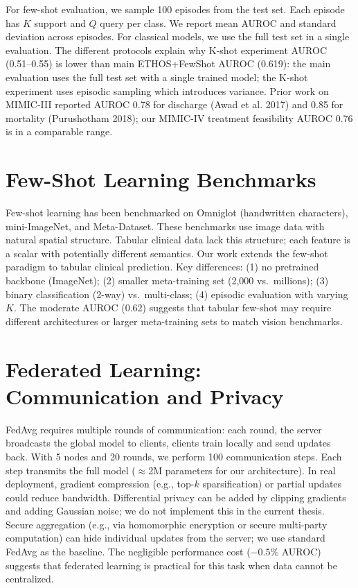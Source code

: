 For few-shot evaluation, we sample 100 episodes from the test set. Each episode has $K$ support and $Q$ query per class. We report mean AUROC and standard deviation across episodes. For classical models, we use the full test set in a single evaluation. The different protocols explain why K-shot experiment AUROC (0.51--0.55) is lower than main ETHOS+FewShot AUROC (0.619): the main evaluation uses the full test set with a single trained model; the K-shot experiment uses episodic sampling which introduces variance. Prior work on MIMIC-III reported AUROC 0.78 for discharge (Awad et al. 2017) and 0.85 for mortality (Purushotham 2018); our MIMIC-IV treatment feasibility AUROC 0.76 is in a comparable range.

\section{Few-Shot Learning Benchmarks}

Few-shot learning has been benchmarked on Omniglot (handwritten characters), mini-ImageNet, and Meta-Dataset. These benchmarks use image data with natural spatial structure. Tabular clinical data lack this structure; each feature is a scalar with potentially different semantics. Our work extends the few-shot paradigm to tabular clinical prediction. Key differences: (1) no pretrained backbone (ImageNet); (2) smaller meta-training set (2,000 vs.\ millions); (3) binary classification (2-way) vs.\ multi-class; (4) episodic evaluation with varying $K$. The moderate AUROC (0.62) suggests that tabular few-shot may require different architectures or larger meta-training sets to match vision benchmarks.

\section{Federated Learning: Communication and Privacy}

FedAvg requires multiple rounds of communication: each round, the server broadcasts the global model to clients, clients train locally and send updates back. With 5 nodes and 20 rounds, we perform 100 communication steps. Each step transmits the full model ($\approx$2M parameters for our architecture). In real deployment, gradient compression (e.g., top-$k$ sparsification) or partial updates could reduce bandwidth. Differential privacy can be added by clipping gradients and adding Gaussian noise; we do not implement this in the current thesis. Secure aggregation (e.g., via homomorphic encryption or secure multi-party computation) can hide individual updates from the server; we use standard FedAvg as the baseline. The negligible performance cost ($-0.5\%$ AUROC) suggests that federated learning is practical for this task when data cannot be centralized.


